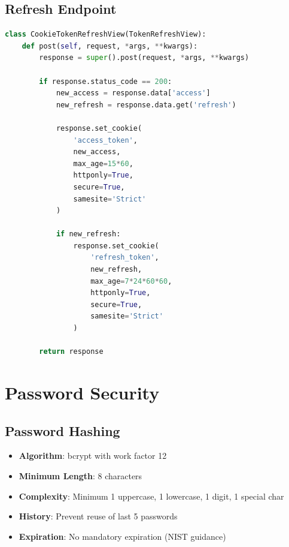 \documentclass{report}
\begin{document}
\subsection{Refresh Endpoint}
\begin{lstlisting}[language=Python]
class CookieTokenRefreshView(TokenRefreshView):
    def post(self, request, *args, **kwargs):
        response = super().post(request, *args, **kwargs)
        
        if response.status_code == 200:
            new_access = response.data['access']
            new_refresh = response.data.get('refresh')
            
            response.set_cookie(
                'access_token',
                new_access,
                max_age=15*60,
                httponly=True,
                secure=True,
                samesite='Strict'
            )
            
            if new_refresh:
                response.set_cookie(
                    'refresh_token',
                    new_refresh,
                    max_age=7*24*60*60,
                    httponly=True,
                    secure=True,
                    samesite='Strict'
                )
        
        return response
\end{lstlisting}

\section{Password Security}

\subsection{Password Hashing}
\begin{itemize}
\item \textbf{Algorithm}: bcrypt with work factor 12
\item \textbf{Minimum Length}: 8 characters
\item \textbf{Complexity}: Minimum 1 uppercase, 1 lowercase, 1 digit, 1 special char
\item \textbf{History}: Prevent reuse of last 5 passwords
\item \textbf{Expiration}: No mandatory expiration (NIST guidance)
\end{itemize}
\end{document}
